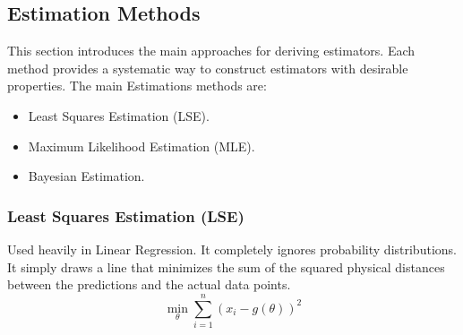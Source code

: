     \subsection{Estimation Methods}

This section introduces the main approaches for deriving estimators. Each method provides a systematic way to construct estimators with desirable properties. The main Estimations methods are: 
\begin{itemize}
    \item Least Squares Estimation (LSE).
    \item Maximum Likelihood Estimation (MLE). 
    \item Bayesian Estimation. 
\end{itemize}

\subsubsection{Least Squares Estimation (LSE)}
Used heavily in Linear Regression. It completely ignores probability distributions. It simply draws a line that minimizes the sum of the squared physical distances between the predictions and the actual data points.
\begin{equation}
    \min_{\theta} \sum_{i=1}^{n} \left(x_i - g(\theta)\right)^2
\end{equation}


